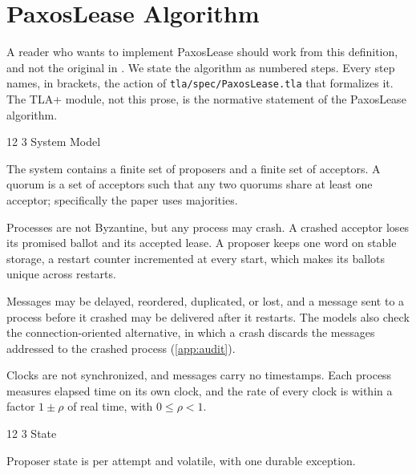 \documentclass[final,5p,times,twocolumn,number]{elsarticle}
\makeatletter
\newcommand{\code}[1]{\texttt{#1}}
\renewcommand\subsection{\@startsection{subsection}{2}{\z@}%
           {12\p@ \@plus 6\p@ \@minus 3\p@}%
           {3\p@ \@plus 6\p@ \@minus 3\p@}%
           {\normalfont\normalsize\bfseries}}
\makeatother
\begin{document}
\section{PaxosLease Algorithm}\label{sec:algorithm}

A reader who wants to implement PaxosLease should work from this definition, and not the original in \cite{ref1}.  We state the algorithm as numbered steps.  Every step names, in brackets, the action of \code{tla/spec/PaxosLease.tla} that formalizes it.  The TLA+ module, not this prose, is the normative statement of the PaxosLease algorithm.

\subsection{System Model}\label{sec:model}

The system contains a finite set of proposers and a finite set of acceptors.  A quorum is a set of acceptors such that any two quorums share at least one acceptor; specifically the paper uses majorities.

Processes are not Byzantine, but any process may crash.  A crashed acceptor loses its promised ballot and its accepted lease.  A proposer keeps one word on stable storage, a restart counter incremented at every start, which makes its ballots unique across restarts.

Messages may be delayed, reordered, duplicated, or lost, and a message sent to a process before it crashed may be delivered after it restarts.  The models also check the connection-oriented alternative, in which a crash discards the messages addressed to the crashed process (\ref{app:audit}).

Clocks are not synchronized, and messages carry no timestamps.  Each process measures elapsed time on its own clock, and the rate of every clock is within a factor $1 \pm \rho$ of real time, with $0 \leq \rho < 1$.

\subsection{State}

Proposer state is per attempt and volatile, with one durable exception.
\end{document}
